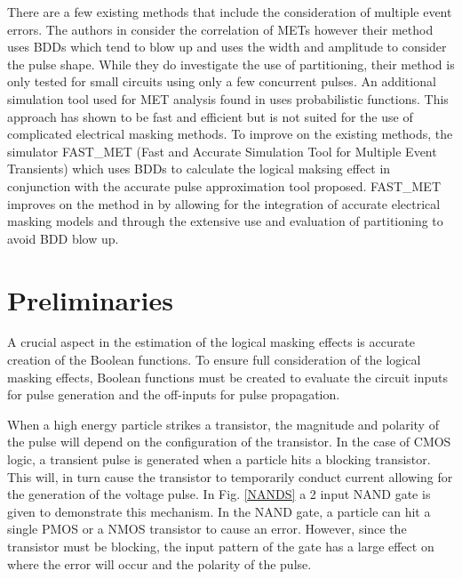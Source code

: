 There are a few existing methods that include the consideration of multiple event errors. The authors in \cite{METSys} consider the correlation of METs however their method uses BDDs which tend to blow up and uses the width and amplitude to consider the pulse shape. While they do investigate the use of partitioning, their method is only tested for small circuits using only a few concurrent pulses. An additional simulation tool used for MET analysis found in \cite{Fazeli2011} uses probabilistic functions. This approach has shown to be fast and efficient but is not suited for the use of complicated electrical masking methods. To improve on the existing methods, the simulator FAST\_MET (Fast and Accurate Simulation Tool for Multiple Event Transients) which uses BDDs to calculate the logical maksing effect in conjunction with the accurate pulse approximation tool proposed. FAST\_MET improves on the method in \cite{METSys} by allowing for the integration of accurate electrical masking models and through the extensive use and evaluation of partitioning to avoid BDD blow up.    

\section{Preliminaries} \label{ch3:prelim}

A crucial aspect in the estimation of the logical masking effects is accurate creation of the Boolean functions. To ensure full consideration of the logical masking effects, Boolean functions must be created to evaluate the circuit inputs for pulse generation and the off-inputs for pulse propagation.

When a high energy particle strikes a transistor, the magnitude and polarity of the pulse will depend on the configuration of the transistor. In the case of CMOS logic, a transient pulse is generated when a particle hits a blocking transistor. This will, in turn cause the transistor to temporarily conduct current allowing for the generation of the voltage pulse. In Fig. \ref{NANDS} a 2 input NAND gate is given to demonstrate this mechanism. In the NAND gate, a particle can hit a single PMOS or a NMOS transistor to cause an error. However, since the transistor must be blocking, the input pattern of the gate has a large effect on where the error will occur and the polarity of the pulse. 

